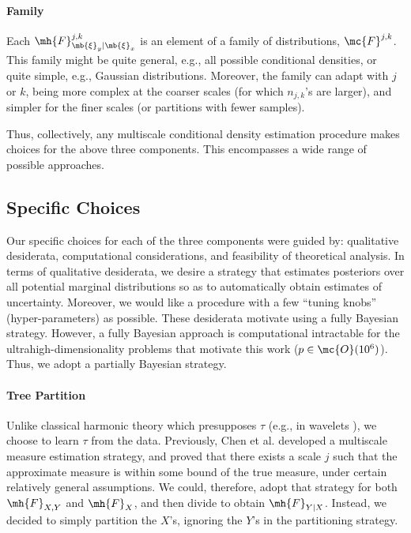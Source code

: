 \paragraph{Family} Each $\mh{F}^{j,k}_{\mb{\xi}_y | \mb{\xi}_x}$ is an element of a family of distributions, $\mc{F}^{j,k}$.  This family might be quite general, e.g., all possible conditional densities, or quite simple, e.g., Gaussian distributions.  Moreover, the family can adapt with $j$ or $k$, being more complex at the coarser scales (for which $n_{j,k}$'s are larger), and simpler for the finer scales (or partitions with fewer samples).


Thus, collectively, any multiscale conditional density estimation procedure makes choices for the above three components.  This encompasses a wide range of possible approaches. 



\subsection{Specific Choices} \label{sub:spec}

Our specific choices for each of the three components were guided by: qualitative desiderata, computational considerations, and feasibility of theoretical analysis.  In terms of qualitative desiderata, we desire a strategy that estimates posteriors over all potential marginal distributions so as to automatically obtain estimates of uncertainty.  Moreover, we would like a procedure with a few ``tuning knobs'' (hyper-parameters) as possible.  These desiderata motivate using a fully Bayesian strategy.  
However, a fully Bayesian approach is computational intractable for the ultrahigh-dimensionality problems that motivate this work ($ p \in \mc{O}(10^6)$).  Thus, we adopt a partially Bayesian strategy.  

	\paragraph{Tree Partition} Unlike classical harmonic theory which presupposes $\tau$ (e.g., in wavelets \cite{Daubechies1992}), we choose to learn $\tau$ from the data. Previously, Chen et al. \cite{ChenMaggioni12} developed a multiscale measure estimation strategy, and proved that there exists a scale $j$ such that the approximate measure is within some bound of the true measure, under certain relatively general assumptions.  We could, therefore, adopt that strategy for both $\mh{F}_{X,Y}$ and $\mh{F}_{X}$, and then divide to obtain $\mh{F}_{Y|X}$.  Instead, we decided to simply partition the $X$'s, ignoring the $Y$'s in the partitioning strategy.  
	
